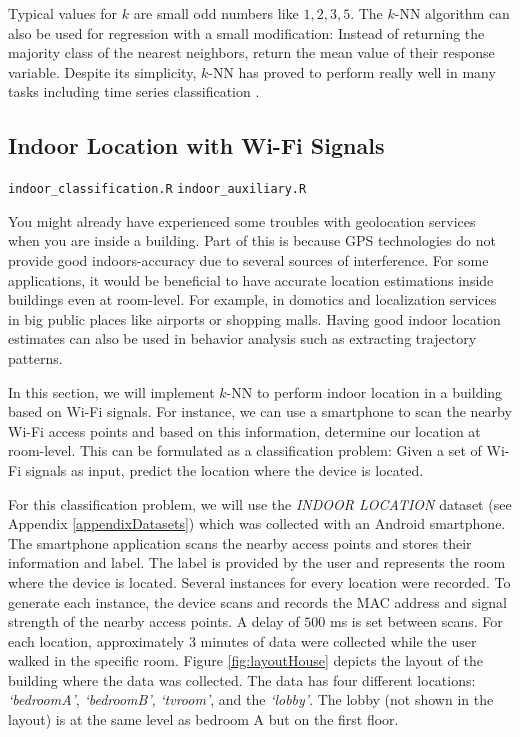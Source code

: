 \documentclass[
  11pt,
]{krantz}
\makeatletter
\newenvironment{kframe}{%
\medskip{}
\setlength{\fboxsep}{.8em}
 \def\at@end@of@kframe{}%
 \ifinner\ifhmode%
  \def\at@end@of@kframe{\end{minipage}}%
  \begin{minipage}{\columnwidth}%
 \fi\fi%
 \def\FrameCommand##1{\hskip\@totalleftmargin \hskip-\fboxsep
 \colorbox{shadecolor}{##1}\hskip-\fboxsep
     \hskip-\linewidth \hskip-\@totalleftmargin \hskip\columnwidth}%
 \MakeFramed {\advance\hsize-\width
   \@totalleftmargin\z@ \linewidth\hsize
   \@setminipage}}%
 {\par\unskip\endMakeFramed%
 \at@end@of@kframe}
\newenvironment{rmdblock}[1]
  {
  \begin{itemize}
  \renewcommand{\labelitemi}{
    \raisebox{-.7\height}[0pt][0pt]{
      {\setkeys{Gin}{width=3em,keepaspectratio}\texttt{[image: images/icons/\#1]}}
    }
  }
  \setlength{\fboxsep}{1em}
  \begin{kframe}
  \item
  }
  {
  \end{kframe}
  \end{itemize}
  }
\newenvironment{rmdfolder}
  {\begin{rmdblock}{folder}}
  {\end{rmdblock}}
\makeatother
\begin{document}
Typical values for \(k\) are small odd numbers like \(1,2,3,5\). The \(k\)-NN algorithm can also be used for regression with a small modification: Instead of returning the majority class of the nearest neighbors, return the mean value of their response variable. Despite its simplicity, \(k\)-NN has proved to perform really well in many tasks including time series classification \citep{xi2006}.

\hypertarget{indoor-location-with-wi-fi-signals}{%
\subsection{Indoor Location with Wi-Fi Signals}\label{indoor-location-with-wi-fi-signals}}

\begin{rmdfolder}
\texttt{indoor\_classification.R} \texttt{indoor\_auxiliary.R}
\end{rmdfolder}

You might already have experienced some troubles with geolocation services when you are inside a building. Part of this is because GPS technologies do not provide good indoors-accuracy due to several sources of interference. For some applications, it would be beneficial to have accurate location estimations inside buildings even at room-level. For example, in domotics and localization services in big public places like airports or shopping malls. Having good indoor location estimates can also be used in behavior analysis such as extracting trajectory patterns.

In this section, we will implement \(k\)-NN to perform indoor location in a building based on Wi-Fi signals. For instance, we can use a smartphone to scan the nearby Wi-Fi access points and based on this information, determine our location at room-level. This can be formulated as a classification problem: Given a set of Wi-Fi signals as input, predict the location where the device is located.

For this classification problem, we will use the \emph{INDOOR LOCATION} dataset (see Appendix \ref{appendixDatasets}) which was collected with an Android smartphone. The smartphone application scans the nearby access points and stores their information and label. The label is provided by the user and represents the room where the device is located. Several instances for every location were recorded. To generate each instance, the device scans and records the MAC address and signal strength of the nearby access points. A delay of \(500\) ms is set between scans. For each location, approximately \(3\) minutes of data were collected while the user walked in the specific room. Figure \ref{fig:layoutHouse} depicts the layout of the building where the data was collected. The data has four different locations: \emph{`bedroomA'}, \emph{`bedroomB'}, \emph{`tvroom'}, and the \emph{`lobby'}. The lobby (not shown in the layout) is at the same level as bedroom A but on the first floor.
\end{document}
